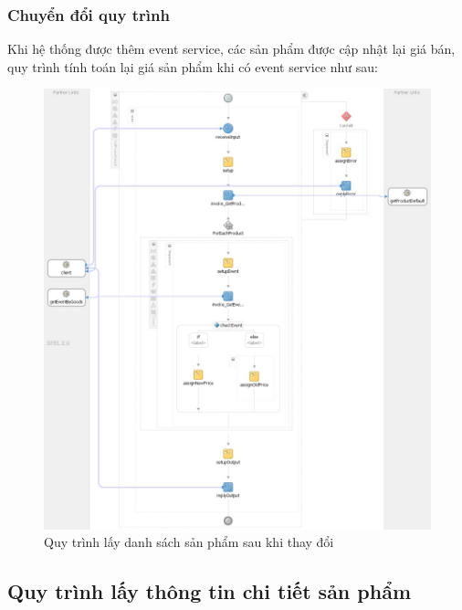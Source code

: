 \subsubsection*{Chuyển đổi quy trình}
Khi hệ thống được thêm event service, các sản phẩm được cập nhật lại giá bán, quy trình tính toán lại giá sản phẩm khi có event service như sau:
\begin{figure}[!htp]
    \centering
    \includegraphics[width=14cm]{img/bpel/productDefaultAfter.jpg}
    \newline
    \caption{Quy trình lấy danh sách sản phẩm sau khi thay đổi}
\end{figure}

\newpage

\subsection{Quy trình lấy thông tin chi tiết sản phẩm}

